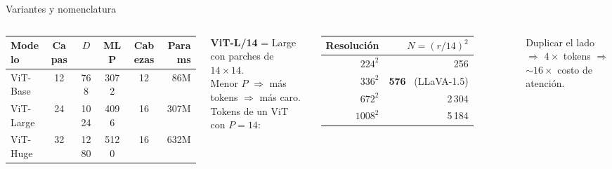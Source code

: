\documentclass[aspectratio=169,10pt]{beamer}
\newcommand{\refbox}[1]{\begin{flushright}\vspace{-2mm}{\scriptsize\color{cGray}#1}\end{flushright}}
\begin{document}
\begin{frame}{Variantes y nomenclatura}
  \begin{columns}[c]
    \centering
    \begin{tabular}{lcccc r}
      \toprule
      Modelo & Capas & $D$ & MLP & Cabezas & Params \\
      \midrule
      ViT-Base  & 12 & 768  & 3072 & 12 & 86M \\
      ViT-Large & 24 & 1024 & 4096 & 16 & 307M \\
      ViT-Huge  & 32 & 1280 & 5120 & 16 & 632M \\
      \bottomrule
    \end{tabular}

    \vspace{3mm}
    \small \textbf{ViT-L/14} = Large con parches de $14\times14$.\\ Menor $P$ $\Rightarrow$ más tokens $\Rightarrow$ más caro.
    \centering
    \small Tokens de un ViT con $P=14$:\\[1mm]
    \begin{tabular}{rr}
      \toprule
      Resolución & $N=(r/14)^2$ \\
      \midrule
      $224^2$ & 256 \\
      $336^2$ & \textbf{576} \ (LLaVA-1.5) \\
      $672^2$ & 2\,304 \\
      $1008^2$ & 5\,184 \\
      \bottomrule
    \end{tabular}

    \vspace{2mm}
    \small Duplicar el lado $\Rightarrow$ $4\times$ tokens $\Rightarrow$ $\sim16\times$ costo de atención.
  \end{columns}
  \refbox{ViT, Tabla 1}
\end{frame}
\end{document}
